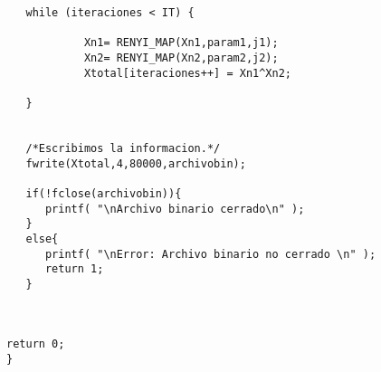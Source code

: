 \documentclass[12pt,3p]{elsarticle}
\begin{document}
\begin{verbatim}
   while (iteraciones < IT) {

            Xn1= RENYI_MAP(Xn1,param1,j1);
            Xn2= RENYI_MAP(Xn2,param2,j2);
            Xtotal[iteraciones++] = Xn1^Xn2;
 
   } 
 

   /*Escribimos la informacion.*/
   fwrite(Xtotal,4,80000,archivobin); 

   if(!fclose(archivobin)){
      printf( "\nArchivo binario cerrado\n" );
   }
   else{
      printf( "\nError: Archivo binario no cerrado \n" );
      return 1;
   }  

  

return 0;
}
\end{verbatim}
\end{document}
